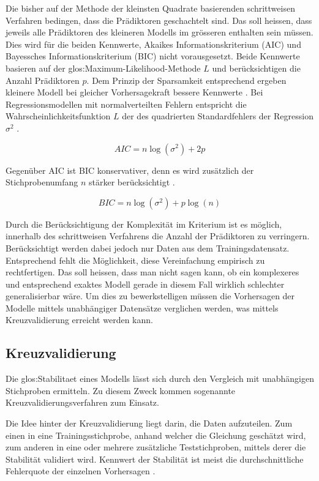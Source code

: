 Die bisher auf der Methode der kleinsten Quadrate basierenden schrittweisen Verfahren bedingen, dass die Prädiktoren geschachtelt sind. 
Das soll heissen, dass jeweils alle Prädiktoren des kleineren Modells im grösseren enthalten sein müssen. 
Dies wird für die  beiden Kennwerte, Akaikes Informationskriterium (AIC) und  Bayessches Informationskriterium (BIC) nicht vorausgesetzt. 
Beide Kennwerte basieren auf der \Gls{glos:Maximum-Likelihood-Methode} $L$ und  berücksichtigen die Anzahl Prädiktoren $p$. 
Dem Prinzip der Sparsamkeit entsprechend ergeben kleinere Modell bei gleicher Vorhersagekraft bessere Kennwerte \cite[p. 509]{jacob2003applied}. 
Bei Regressionsmodellen mit normalverteilten Fehlern entspricht die Wahrscheinlichkeitsfunktion $L$ der des quadrierten Standardfehlers der Regression $\sigma^2$ \cite[p. 169]{weakliem2004introduction}. 

\begin{equation}
AIC = n \log(\sigma^2) + 2p
\tag{AIC}
\end{equation}

Gegenüber AIC ist BIC konservativer, denn es wird zusätzlich der Stichprobenumfang $n$ stärker berücksichtigt \cite[p. 169]{weakliem2004introduction}. 

\begin{equation}
BIC = n\log(\sigma^2) + p\log(n)
\tag{BIC}
\end{equation}

Durch die Berücksichtigung der Komplexität im Kriterium ist es möglich, innerhalb des schrittweisen Verfahrens die Anzahl der Prädiktoren zu verringern.  Berücksichtigt werden dabei jedoch nur Daten aus dem Trainingsdatensatz. Entsprechend fehlt die Möglichkeit, diese Vereinfachung empirisch zu rechtfertigen. Das soll heissen, dass man nicht sagen kann, ob ein komplexeres und entsprechend exaktes Modell gerade in diesem Fall wirklich schlechter generalisierbar wäre. Um dies zu bewerkstelligen müssen die Vorhersagen der Modelle mittels unabhängiger Datensätze verglichen werden, was mittels Kreuzvalidierung erreicht werden kann. 

\subsection{Kreuzvalidierung}
Die \Gls{glos:Stabilitaet} eines Modells lässt sich durch den Vergleich mit unabhängigen Stichproben ermitteln.
Zu diesem Zweck kommen sogenannte Kreuzvalidierungsverfahren zum Einsatz.

Die Idee hinter der Kreuzvalidierung liegt darin, die Daten aufzuteilen. Zum einen in eine Trainingsstichprobe, anhand welcher die Gleichung geschätzt wird, zum anderen in eine oder mehrere zusätzliche Teststichproben, mittels derer die Stabilität validiert wird. Kennwert der Stabilität ist meist die durchschnittliche Fehlerquote der einzelnen Vorhersagen \cite[p. 3]{arlot2010survey}. 

